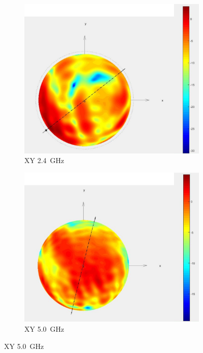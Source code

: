 \begin{figure}[h!]
	\begin{center}
		\begin{subfigure}[t]{0.40\textwidth}
			\begin{center}
				\includegraphics[width=1\textwidth]{../fig/plt/star_lab_2ghz4_xy_reduced.png}
				\caption{XY \SI{2.4}{\giga\hertz}}
			\end{center}
		\end{subfigure}
		\begin{subfigure}[t]{0.40\textwidth}
			\begin{center}
				\includegraphics[width=1\textwidth]{../fig/plt/star_lab_5ghz0_xy_reduced.png}
				\caption{XY \SI{5.0}{\giga\hertz}}
			\end{center}
		\end{subfigure}
		

\end{center}
\end{figure}
